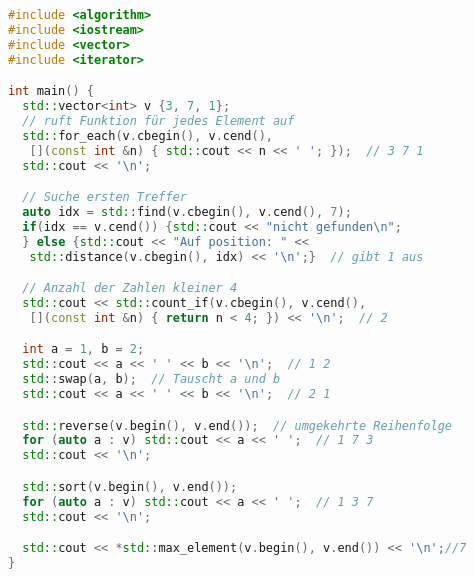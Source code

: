\begin{lstlisting}[language=C++]
#include <algorithm>
#include <iostream>
#include <vector>
#include <iterator>

int main() {
  std::vector<int> v {3, 7, 1};
  // ruft Funktion für jedes Element auf
  std::for_each(v.cbegin(), v.cend(),
   [](const int &n) { std::cout << n << ' '; });  // 3 7 1
  std::cout << '\n';

  // Suche ersten Treffer
  auto idx = std::find(v.cbegin(), v.cend(), 7);
  if(idx == v.cend()) {std::cout << "nicht gefunden\n";
  } else {std::cout << "Auf position: " <<
   std::distance(v.cbegin(), idx) << '\n';}  // gibt 1 aus

  // Anzahl der Zahlen kleiner 4
  std::cout << std::count_if(v.cbegin(), v.cend(),
   [](const int &n) { return n < 4; }) << '\n';  // 2

  int a = 1, b = 2;
  std::cout << a << ' ' << b << '\n';  // 1 2
  std::swap(a, b);  // Tauscht a und b
  std::cout << a << ' ' << b << '\n';  // 2 1

  std::reverse(v.begin(), v.end());  // umgekehrte Reihenfolge
  for (auto a : v) std::cout << a << ' ';  // 1 7 3
  std::cout << '\n';

  std::sort(v.begin(), v.end());
  for (auto a : v) std::cout << a << ' ';  // 1 3 7
  std::cout << '\n';

  std::cout << *std::max_element(v.begin(), v.end()) << '\n';//7
}
\end{lstlisting}

